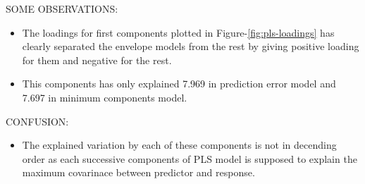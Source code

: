 \documentclass[12pt,3p,authoryear]{elsarticle}
\providecommand{\tightlist}{%
  \setlength{\itemsep}{0pt}\setlength{\parskip}{0pt}}
\begin{document}
SOME OBSERVATIONS:

\begin{itemize}
\tightlist
\item
  The loadings for first components plotted in
  Figure-\ref{fig:pls-loadings} has clearly separated the envelope
  models from the rest by giving positive loading for them and negative
  for the rest.
\item
  This components has only explained 7.969 in prediction error model and
  7.697 in minimum components model.
\end{itemize}

CONFUSION:

\begin{itemize}
\tightlist
\item
  The explained variation by each of these components is not in
  decending order as each successive components of PLS model is supposed
  to explain the maximum covarinace between predictor and response.
\end{itemize}

\hypertarget{refs}{}

\hypertarget{appendix-appendix-a}{%
\appendix}



\renewcommand\refname{References}

\end{document}
